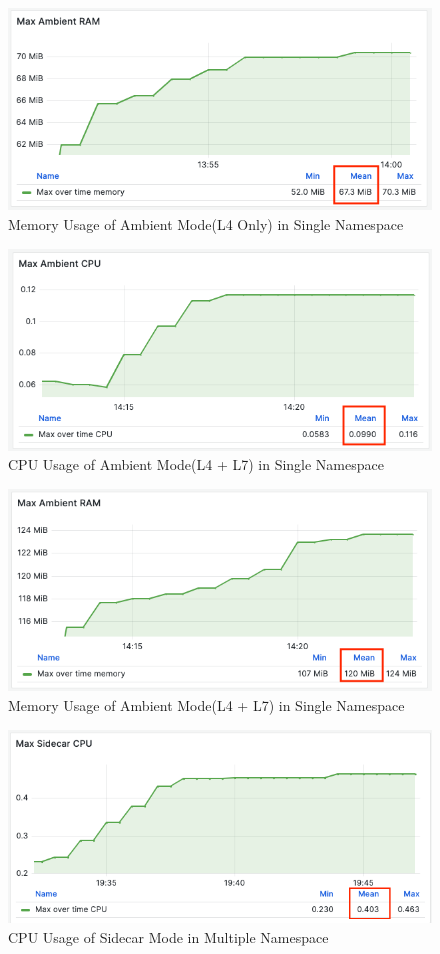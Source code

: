 \begin{figure}[H]
  \centering
  \includegraphics[width=0.8\linewidth]{resources/max-ambient-l4-mem.png}
  \caption{Memory Usage of Ambient Mode(L4 Only) in Single Namespace}
\end{figure}

\begin{figure}[H]
  \centering
  \includegraphics[width=0.78\linewidth]{resources/max-ambient-l4-l7-cpu.png}
  \caption{CPU Usage of Ambient Mode(L4 + L7) in Single Namespace}
\end{figure}

\begin{figure}[H]
  \centering
  \includegraphics[width=0.8\linewidth]{resources/max-ambient-l4-l7-mem.png}
  \caption{Memory Usage of Ambient Mode(L4 + L7) in Single Namespace}
\end{figure}


\begin{figure}[H]
  \centering
  \includegraphics[width=0.8\linewidth]{resources/multi-ns-sidecar-cpu.png}
  \caption{CPU Usage of Sidecar Mode in Multiple Namespace}
\end{figure}

